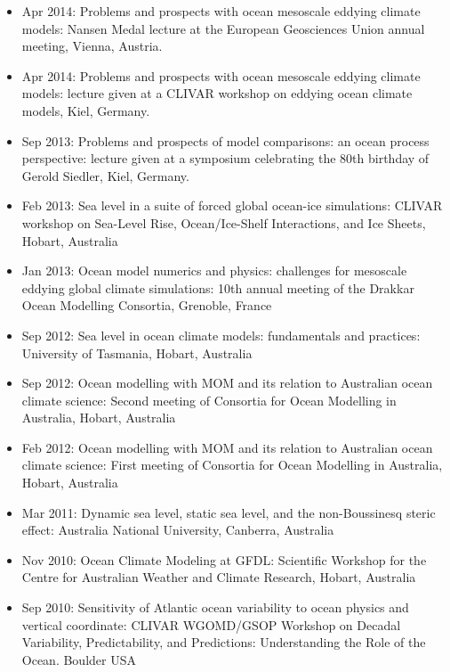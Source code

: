 \documentclass{article}
\begin{document}
\begin{itemize}[leftmargin=*]
\item Apr 2014: {\sc Problems and prospects with ocean mesoscale
    eddying climate models}: Nansen Medal lecture at the European
  Geosciences Union annual meeting, Vienna, Austria.

\item Apr 2014: {\sc Problems and prospects with ocean mesoscale
    eddying climate models}: lecture given at a CLIVAR workshop on
  eddying ocean climate models, Kiel, Germany.

\item Sep 2013: {\sc Problems and prospects of model comparisons: an
    ocean process perspective}: lecture given at a symposium
  celebrating the 80th birthday of Gerold Siedler, Kiel, Germany.

\item Feb 2013: {\sc Sea level in a suite of forced global ocean-ice
    simulations}: CLIVAR workshop on Sea-Level Rise, Ocean/Ice-Shelf
  Interactions, and Ice Sheets, Hobart, Australia

\item Jan 2013: {\sc Ocean model numerics and physics: challenges for
    mesoscale eddying global climate simulations}: 10th annual meeting
  of the Drakkar Ocean Modelling Consortia, Grenoble, France

\item Sep 2012: {\sc Sea level in ocean climate models: fundamentals
    and practices}: University of Tasmania, Hobart, Australia

\item Sep 2012: {\sc Ocean modelling with MOM and its relation to
    Australian ocean climate science}: Second meeting of Consortia for
  Ocean Modelling in Australia, Hobart, Australia

\item Feb 2012: {\sc Ocean modelling with MOM and its relation to
    Australian ocean climate science}: First meeting of Consortia for
  Ocean Modelling in Australia, Hobart, Australia

\item Mar 2011: {\sc Dynamic sea level, static sea level, and the
    non-Boussinesq steric effect}: Australia National University,
  Canberra, Australia

\item Nov 2010:  {\sc Ocean Climate Modeling at GFDL}: Scientific
  Workshop for the Centre for Australian Weather and Climate Research,
  Hobart, Australia

\item Sep 2010:  {\sc Sensitivity of Atlantic ocean variability to
    ocean physics and vertical coordinate}: CLIVAR WGOMD/GSOP Workshop
  on Decadal Variability, Predictability, and Predictions:
  Understanding the Role of the Ocean. Boulder USA 


\end{itemize}
\end{document}
